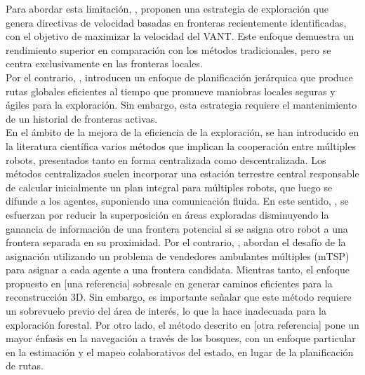 \documentclass[sigconf]{acmart}
\begin{document}
Para abordar esta limitación, \citeauthor{CIESLEWSKI2017} \cite{CIESLEWSKI2017}, proponen una estrategia de exploración que genera directivas de velocidad basadas en fronteras recientemente identificadas, con el objetivo de maximizar la velocidad del VANT. Este enfoque demuestra un rendimiento superior en comparación con los métodos tradicionales, pero se centra exclusivamente en las fronteras locales.\\

Por el contrario, \citeauthor{FUEL} \cite{FUEL}, introducen un enfoque de planificación jerárquica que produce rutas globales eficientes al tiempo que promueve maniobras locales seguras y ágiles para la exploración. Sin embargo, esta estrategia requiere el mantenimiento de un historial de fronteras activas.\\ %

En el ámbito de la mejora de la eficiencia de la exploración, se han introducido en la literatura científica varios métodos que implican la cooperación entre múltiples robots, presentados tanto en forma centralizada como descentralizada. Los métodos centralizados suelen incorporar una estación terrestre central responsable de calcular inicialmente un plan integral para múltiples robots, que luego se difunde a los agentes, suponiendo una comunicación fluida. En este sentido, \citeauthor{1435481} \cite{1435481}, se esfuerzan por reducir la superposición en áreas exploradas disminuyendo la ganancia de información de una frontera potencial si se asigna otro robot a una frontera separada en su proximidad. Por el contrario, \citeauthor{Tian} \cite{Tian}, abordan el desafío de la asignación utilizando un problema de vendedores ambulantes múltiples (mTSP) para asignar a cada agente a una frontera candidata. Mientras tanto, el enfoque propuesto en [una referencia] sobresale en generar caminos eficientes para la reconstrucción 3D. Sin embargo, es importante señalar que este método requiere un sobrevuelo previo del área de interés, lo que la hace inadecuada para la exploración forestal. Por otro lado, el método descrito en [otra referencia] pone un mayor énfasis en la navegación a través de los bosques, con un enfoque particular en la estimación y el mapeo colaborativos del estado, en lugar de la planificación de rutas.\\
\end{document}
